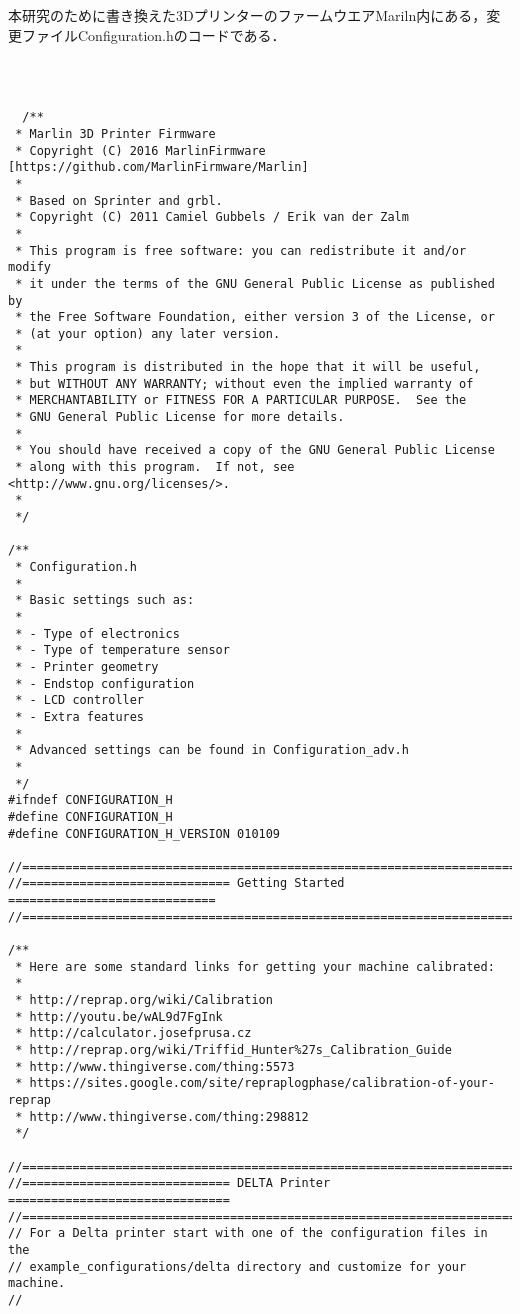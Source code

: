 \chapter{　}
\label{chp:first}
本研究のために書き換えた3DプリンターのファームウエアMariln内にある，変更ファイルConfiguration.hのコードである． 



\begin{lstlisting}



  /**
 * Marlin 3D Printer Firmware
 * Copyright (C) 2016 MarlinFirmware [https://github.com/MarlinFirmware/Marlin]
 *
 * Based on Sprinter and grbl.
 * Copyright (C) 2011 Camiel Gubbels / Erik van der Zalm
 *
 * This program is free software: you can redistribute it and/or modify
 * it under the terms of the GNU General Public License as published by
 * the Free Software Foundation, either version 3 of the License, or
 * (at your option) any later version.
 *
 * This program is distributed in the hope that it will be useful,
 * but WITHOUT ANY WARRANTY; without even the implied warranty of
 * MERCHANTABILITY or FITNESS FOR A PARTICULAR PURPOSE.  See the
 * GNU General Public License for more details.
 *
 * You should have received a copy of the GNU General Public License
 * along with this program.  If not, see <http://www.gnu.org/licenses/>.
 *
 */

/**
 * Configuration.h
 *
 * Basic settings such as:
 *
 * - Type of electronics
 * - Type of temperature sensor
 * - Printer geometry
 * - Endstop configuration
 * - LCD controller
 * - Extra features
 *
 * Advanced settings can be found in Configuration_adv.h
 *
 */
#ifndef CONFIGURATION_H
#define CONFIGURATION_H
#define CONFIGURATION_H_VERSION 010109

//===========================================================================
//============================= Getting Started =============================
//===========================================================================

/**
 * Here are some standard links for getting your machine calibrated:
 *
 * http://reprap.org/wiki/Calibration
 * http://youtu.be/wAL9d7FgInk
 * http://calculator.josefprusa.cz
 * http://reprap.org/wiki/Triffid_Hunter%27s_Calibration_Guide
 * http://www.thingiverse.com/thing:5573
 * https://sites.google.com/site/repraplogphase/calibration-of-your-reprap
 * http://www.thingiverse.com/thing:298812
 */

//===========================================================================
//============================= DELTA Printer ===============================
//===========================================================================
// For a Delta printer start with one of the configuration files in the
// example_configurations/delta directory and customize for your machine.
//


\end{lstlisting}
